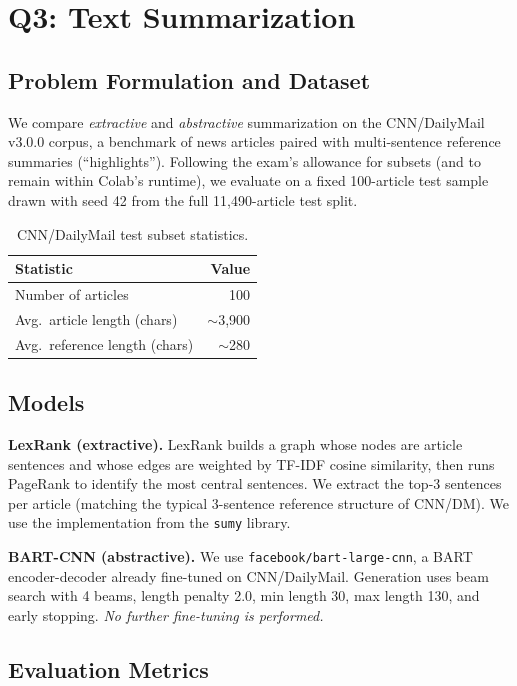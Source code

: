 \documentclass[11pt,a4paper]{article}
\begin{document}
\section{Q3: Text Summarization}

\subsection{Problem Formulation and Dataset}

We compare \emph{extractive} and \emph{abstractive} summarization on the CNN/DailyMail v3.0.0 corpus, a benchmark of news articles paired with multi-sentence reference summaries (``highlights''). Following the exam's allowance for subsets (and to remain within Colab's runtime), we evaluate on a fixed 100-article test sample drawn with seed 42 from the full 11{,}490-article test split.

\begin{table}[h!]
\centering
\small
\caption{CNN/DailyMail test subset statistics.}
\begin{tabular}{lr}
\toprule
\textbf{Statistic} & \textbf{Value}\\
\midrule
Number of articles      & 100\\
Avg.\ article length (chars)   & $\sim$3{,}900\\
Avg.\ reference length (chars) & $\sim$280\\
\bottomrule
\end{tabular}
\end{table}

\subsection{Models}

\textbf{LexRank (extractive).} LexRank builds a graph whose nodes are article sentences and whose edges are weighted by TF-IDF cosine similarity, then runs PageRank to identify the most central sentences. We extract the top-3 sentences per article (matching the typical 3-sentence reference structure of CNN/DM). We use the implementation from the \texttt{sumy} library.

\textbf{BART-CNN (abstractive).} We use \texttt{facebook/bart-large-cnn}, a BART encoder-decoder already fine-tuned on CNN/DailyMail. Generation uses beam search with 4 beams, length penalty 2.0, min length 30, max length 130, and early stopping. \emph{No further fine-tuning is performed.}

\subsection{Evaluation Metrics}
\end{document}
